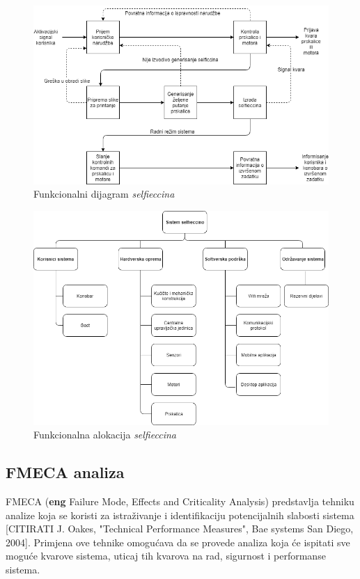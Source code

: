 \documentclass[12pt]{article}
\begin{document}
\begin{figure}[!h]
\centering
\includegraphics[scale=0.65]{funkcdijagram}
\caption{Funkcionalni dijagram \textit{selfieccina}}
\label{funkcdijagram}
\end{figure}

\newpage

\begin{figure}[!h]
\centering
\includegraphics[scale=0.6]{funkcalokacija}
\caption{Funkcionalna alokacija \textit{selfieccina}}
\label{funkcalokacija}
\end{figure}
 
 \newpage
\subsection{FMECA analiza} 
FMECA (\textbf{eng} Failure Mode, Effects and Criticality Analysis) predstavlja tehniku analize koja se koristi za istra\v{z}ivanje i identifikaciju potencijalnih slabosti sistema [CITIRATI  J. Oakes, "Technical Performance Measures", Bae systems San Diego, 2004]. Primjena ove tehnike omogu\'cava da se provede analiza koja \'ce ispitati sve mogu\'ce kvarove sistema, uticaj tih kvarova na rad, sigurnost i performanse sistema.
\end{document}
